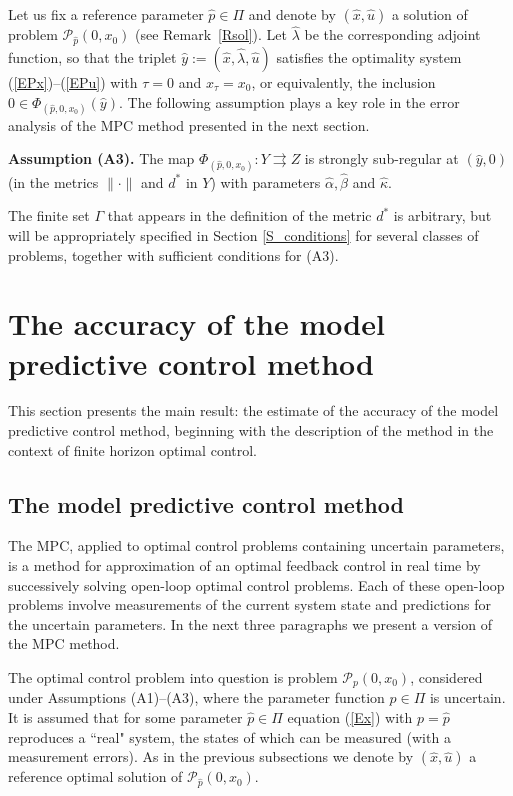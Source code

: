 \documentclass[11pt]{article}
\newcommand{\al}{\alpha}
\newcommand{\p}{{\mathcal P}}
\newcommand{\To}{\rightrightarrows }
\newcommand{\bino}{\bigskip\noindent}
\begin{document}
\bino
Let us fix a reference parameter $\hat p \in \varPi$ and denote by $(\hat x, \hat u)$ a solution of problem
$\p_{\hat p}(0,x_0)$ (see Remark~\ref{Rsol}). Let $\hat \lambda$ be the corresponding adjoint function, 
so that the triplet $\hat y := (\hat x, \hat \lambda, \hat u)$ satisfies the optimality system (\ref{EPx})--(\ref{EPu})
with $\tau = 0$ and $x_\tau = x_0$,  or equivalently, the inclusion $0 \in \Phi_{(\hat p,0,x_0)}(\hat y)$.
The following assumption plays a key role in the error analysis of the MPC method presented in the next section. 

\bino
{\bf Assumption (A3).} The map $\Phi_{(\hat p,0,x_0)} : Y \To Z$ is strongly sub-regular 
at $(\hat y,0)$ (in the metrics $\| \cdot \|$ and $d^*$ in $Y$) with parameters $\hat \al,\hat \beta$ and $\hat \kappa$.

\bino
The finite set $\Gamma$ that appears in the definition of the metric $d^*$ is arbitrary, but will be appropriately 
specified in Section \ref{S_conditions} for several classes of problems, together with sufficient conditions for (A3).

\section{The accuracy of the model predictive control method} \label{S_MPC}

This section presents the main result: the estimate of the accuracy of the model predictive control method,
beginning with the description of the method in the context of finite horizon optimal control.

\subsection{The model predictive control method} \label{SS_MPC}

The MPC, applied to optimal control problems containing uncertain parameters, is a method 
for approximation of an optimal feedback control in real time by successively solving open-loop 
optimal control problems. Each of these open-loop problems involve measurements of the current system
state and predictions for the uncertain parameters. In the next three paragraphs we present a version of the MPC method.

The optimal control problem into question is problem $\p_p(0,x_0)$, considered under Assumptions (A1)--(A3),
where the parameter function $p \in \varPi$ is uncertain.
It is assumed that for some parameter $\hat p \in \varPi$ equation (\ref{Ex}) with $p = \hat p$ 
reproduces a ``real" system, the states of which can be measured (with a measurement
errors). As in the previous subsections we denote by $(\hat x, \hat u)$ a reference optimal solution 
of $\p_{\hat p}(0,x_0)$. 
\end{document}
